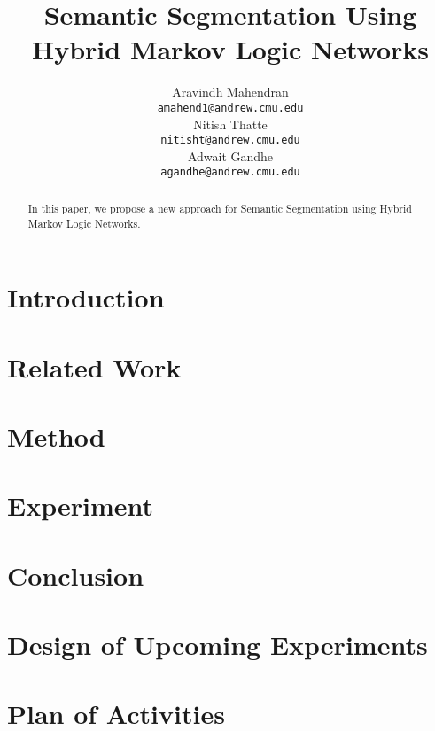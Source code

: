 \documentclass{article} %
\title{Semantic Segmentation Using Hybrid Markov Logic Networks}
\author{
Aravindh Mahendran \\
\texttt{amahend1@andrew.cmu.edu} \\ 
\And
Nitish Thatte \\
\texttt{nitisht@andrew.cmu.edu} \\
\AND
Adwait Gandhe \\
\texttt{agandhe@andrew.cmu.edu} \\
}
\begin{document}
\maketitle

\begin{abstract}
In this paper, we propose a new approach for Semantic Segmentation using Hybrid Markov Logic Networks. 
\end{abstract}


\section{Introduction}



\section{Related Work}


\section{Method}


\section{Experiment}


\section{Conclusion}

\section{Design of Upcoming Experiments}

\section{Plan of Activities}


\end{document}
